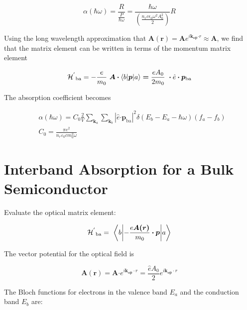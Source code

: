 \begin{equation}
\alpha\left( \hbar\omega \right) = \frac{R}{\frac{P}{\hbar\omega}} = \frac{\hbar\omega}{(\frac{n_{r}c\epsilon_{0}\omega^{2}A_{0}^{2}}{2})}R
\end{equation}

Using the long wavelength approximation that
\(\bm{A}\left( \bm{r} \right) = \bm{A}e^{i\bm{k}_{\bm{\text{op}}}\bm{\cdot}r}\bm{\approx A}\),
we find that the matrix element can be written in terms of the momentum
matrix element

\begin{equation}
{\mathcal{H}^{'}}_{\text{ba}} = - \frac{e}{m_{0}}\bm{\ A \cdot}\left\langle b \middle| \bm{p} \middle| a \right\rangle\bm{=}\frac{eA_{0}}{2m_{0}}\bm{\  \cdot}\hat{e}\bm{\cdot}\bm{p}_{\text{ba}}
\end{equation}

The absorption coefficient becomes

\begin{eqnarray}
  & \alpha\left( \hbar\omega \right) = C_{0}\frac{2}{V}\sum_{\bm{k}_{a}}^{}{\sum_{\bm{k}_{b}}^{}\left| \hat{e}\bm{\cdot}\bm{p}_{\text{ba}} \right|^{2}}\delta(E_{b} - E_{a} - \hbar\omega)(f_{a} - f_{b}) \nonumber \\
  & C_{0} = \frac{\pi e^{2}}{n_{r}\varepsilon_{0}cm_{0}^{2}\omega}
\end{eqnarray}


\section{Interband Absorption for a Bulk
Semiconductor}\label{interband-absorption-for-a-bulk-semiconductor}

Evaluate the optical matrix element:

\begin{equation}
{\HAM^{'}}_{\text{ba}} = \bm{\ }\left\langle b \middle| - \frac{e\bm{A(r)}}{m_{0}}\bm{\cdot p} \middle| a \right\rangle
\end{equation}

The vector potential for the optical field is

\begin{equation}
\bm{A}\left( \bm{r} \right)\bm{= A}{\cdot e}^{i\bm{k}_{\bm{\text{op}}} \cdot r} = \frac{\hat{e}A_{0}}{2}e^{i\bm{k}_{\bm{\text{op}}} \cdot r}
\end{equation}

The Bloch functions for electrons in the valence band \(E_{a}\) and the
conduction band \(E_{b}\) are:

